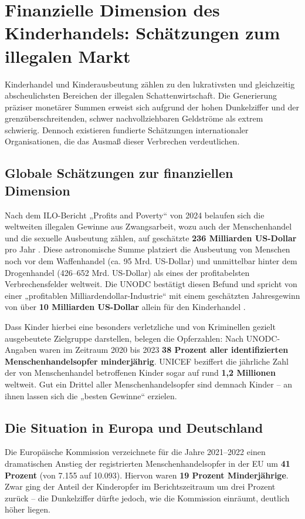 \documentclass[11pt,a4paper]{article}
\begin{document}
	\section{Finanzielle Dimension des Kinderhandels: Schätzungen zum illegalen Markt}
	
	Kinderhandel und Kinderausbeutung zählen zu den lukrativsten und gleichzeitig abscheulichsten Bereichen der illegalen Schattenwirtschaft. Die Generierung präziser monetärer Summen erweist sich aufgrund der hohen Dunkelziffer und der grenzüberschreitenden, schwer nachvollziehbaren Geldströme als extrem schwierig. Dennoch existieren fundierte Schätzungen internationaler Organisationen, die das Ausmaß dieser Verbrechen verdeutlichen.
	
	\subsection{Globale Schätzungen zur finanziellen Dimension}
	
	Nach dem ILO-Bericht „Profits and Poverty“ von 2024 belaufen sich die weltweiten illegalen Gewinne aus Zwangsarbeit, wozu auch der Menschenhandel und die sexuelle Ausbeutung zählen, auf geschätzte \textbf{236 Milliarden US-Dollar} pro Jahr \cite{ilo2024}. Diese astronomische Summe platziert die Ausbeutung von Menschen noch vor dem Waffenhandel (ca. 95 Mrd. US-Dollar) und unmittelbar hinter dem Drogenhandel (426–652 Mrd. US-Dollar) als eines der profitabelsten Verbrechensfelder weltweit. Die UNODC bestätigt diesen Befund und spricht von einer „profitablen Milliardendollar-Industrie“ mit einem geschätzten Jahresgewinn von über \textbf{10 Milliarden US-Dollar} allein für den Kinderhandel \cite{unodc2024}.
	
	Dass Kinder hierbei eine besonders verletzliche und von Kriminellen gezielt ausgebeutete Zielgruppe darstellen, belegen die Opferzahlen: Nach UNODC-Angaben waren im Zeitraum 2020 bis 2023 \textbf{38 Prozent aller identifizierten Menschenhandelsopfer minderjährig}. UNICEF beziffert die jährliche Zahl der von Menschenhandel betroffenen Kinder sogar auf rund \textbf{1,2 Millionen} weltweit. Gut ein Drittel aller Menschenhandelsopfer sind demnach Kinder – an ihnen lassen sich die „besten Gewinne“ erzielen.
	
	\subsection{Die Situation in Europa und Deutschland}
	
	Die Europäische Kommission verzeichnete für die Jahre 2021–2022 einen dramatischen Anstieg der registrierten Menschenhandelsopfer in der EU um \textbf{41 Prozent} (von 7.155 auf 10.093). Hiervon waren \textbf{19 Prozent Minderjährige}. Zwar ging der Anteil der Kinderopfer im Berichtszeitraum um drei Prozent zurück – die Dunkelziffer dürfte jedoch, wie die Kommission einräumt, deutlich höher liegen.
	
\end{document}
